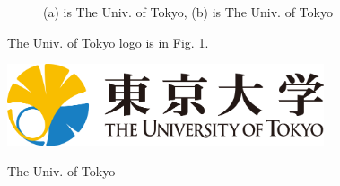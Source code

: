 \begin{figure}[H]
  \centering
  \newcommand{\subfig}[2]{%
    \subfloat[]{\texttt{[image: \#1]}\label{#2}}%
  }
  \subfig{figure/UTokyo_logo.png}{utokyo:4}

  \captionsetup{font=small}
  \caption{(a) is The Univ. of Tokyo, (b) is The Univ. of Tokyo}
  \label{utokyo:s}
\end{figure}

The Univ. of Tokyo logo is in Fig. \ref{utokyo:s}.

\begin{table}[H]
\centerline{\includegraphics[width=0.7\textwidth]{figure/UTokyo_logo.png}}
\captionsetup{font=small}
\caption{The Univ. of Tokyo}
\label{cep}
\end{table}
